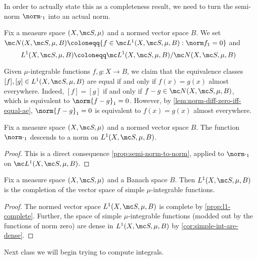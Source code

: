 \documentclass[../notes.tex]{subfiles}
\begin{document}
In order to actually state this as a completeness result, we need to turn the semi-norm $\norm\cdot_1$ into an actual norm.
\begin{notation}
	Fix a measure space $(X,\mc S,\mu)$ and a normed vector space $B$. We set $\mc N(X,\mc S,\mu,B)\coloneqq\{f\in\mc L^1(X,\mc S,\mu,B):\norm f_1=0\}$ and
	\[L^1(X,\mc S,\mu,B)\coloneqq\mc L^1(X,\mc S,\mu,B)/\mc N(X,\mc S,\mu,B)\]
\end{notation}
\begin{remark}
	Given $\mu$-integrable functions $f,g\colon X\to B$, we claim that the equivalence classes $[f],[g]\in L^1(X,\mc S,\mu,B)$ are equal if and only if $f(x)=g(x)$ almost everywhere. Indeed, $[f]=[g]$ if and only if $f-g\in\mc N(X,\mc S,\mu,B)$, which is equivalent to $\norm{f-g}_1=0$. However, by \autoref{lem:norm-diff-zero-iff-equal-ae}, $\norm{f-g}_1=0$ is equivalent to $f(x)=g(x)$ almost everywhere.
\end{remark}
\begin{lemma}
	Fix a measure space $(X,\mc S,\mu)$ and a normed vector space $B$. The function $\norm\cdot_1$ descends to a norm on $L^1(X,\mc S,\mu,B)$.
\end{lemma}
\begin{proof}
	This is a direct consequence \autoref{prop:semi-norm-to-norm}, applied to $\norm\cdot_1$ on $\mc L^1(X,\mc S,\mu,B)$.
\end{proof}
\begin{corollary} \label{cor:l1-complete}
	Fix a measure space $(X,\mc S,\mu)$ and a Banach space $B$. Then $L^1(X,\mc S,\mu,B)$ is the completion of the vector space of simple $\mu$-integrable functions.
\end{corollary}
\begin{proof}
	The normed vector space $L^1(X,\mc S,\mu,B)$ is complete by \autoref{prop:l1-complete}. Further, the space of simple $\mu$-integrable functions (modded out by the functions of norm zero) are dense in $L^1(X,\mc S,\mu,B)$ by \autoref{cor:simple-int-are-dense}.
\end{proof}
Next class we will begin trying to compute integrals.
\end{document}

